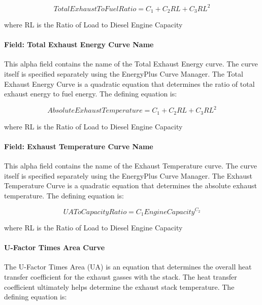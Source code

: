 \begin{equation}
    TotalExhaustToFuelRatio = {C_1} + {C_2}RL + {C_3}R{L^2}
\end{equation}

where RL is the Ratio of Load to Diesel Engine Capacity

\paragraph{Field: Total Exhaust Energy Curve Name}\label{field-total-exhaust-energy-curve-name-000}

This alpha field contains the name of the Total Exhaust Energy curve. The curve itself is specified separately using the EnergyPlus Curve Manager. The Total Exhaust Energy Curve is a quadratic equation that determines the ratio of total exhaust energy to fuel energy. The defining equation is:

\begin{equation}
    AbsoluteExhaustTemperature = {C_1} + {C_2}RL + {C_3}R{L^2}
\end{equation}

where RL is the Ratio of Load to Diesel Engine Capacity

\paragraph{Field: Exhaust Temperature Curve Name}\label{field-exhaust-temperature-curve-name-000}

This alpha field contains the name of the Exhaust Temperature curve. The curve itself is specified separately using the EnergyPlus Curve Manager. The Exhaust Temperature Curve is a quadratic equation that determines the absolute exhaust temperature. The defining equation is:

\begin{equation}
    UAToCapacityRatio = {C_1}EngineCapacit{y^{{C_2}}}
\end{equation}

where RL is the Ratio of Load to Diesel Engine Capacity

\paragraph{U-Factor Times Area Curve}\label{u-factor-times-area-curve}

The U-Factor Times Area (UA) is an equation that determines the overall heat transfer coefficient for the exhaust gasses with the stack. The heat transfer coefficient ultimately helps determine the exhaust stack temperature. The defining equation is:

